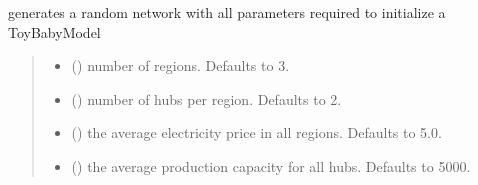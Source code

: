 \documentclass[letterpaper,10pt,english]{sphinxmanual}
\begin{document}
\begin{fulllineitems}
\label{\detokenize{src.sensitivity.babymodel:src.sensitivity.babymodel.generate}}
\pysigstartsignatures
\pysiglinewithargsret
{}
{\sphinxparamcomma {}\sphinxparamcomma {}\sphinxparamcomma {}\sphinxparamcomma {}\sphinxparamcomma {}\sphinxparamcomma {}}
{}
\pysigstopsignatures
\sphinxAtStartPar
generates a random network with all parameters required to initialize a ToyBabyModel
\begin{quote}\begin{description}
\begin{itemize}
\item {} 
\sphinxAtStartPar
{} (\sphinxstyleliteralemphasis{\sphinxupquote{, }}) \textendash{} number of regions. Defaults to 3.

\item {} 
\sphinxAtStartPar
{} (\sphinxstyleliteralemphasis{\sphinxupquote{, }}) \textendash{} number of hubs per region. Defaults to 2.

\item {} 
\sphinxAtStartPar
{} (\sphinxstyleliteralemphasis{\sphinxupquote{, }}) \textendash{} the average electricity price in all regions. Defaults to 5.0.

\item {} 
\sphinxAtStartPar
{} (\sphinxstyleliteralemphasis{\sphinxupquote{, }}) \textendash{} the average production capacity for all hubs. Defaults to 5000.


\end{itemize}
\end{description}
\end{quote}
\end{fulllineitems}
\end{document}
